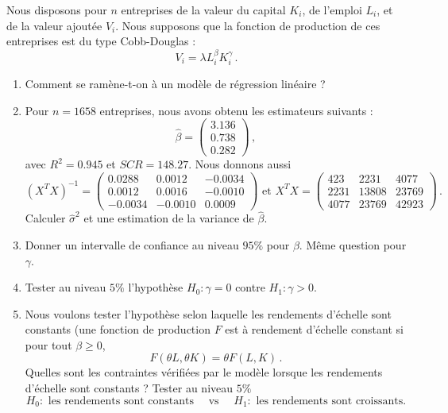 \documentclass{td_um}
\providecommand{\1}{\mathds{1}}
\begin{document}
	
	 Nous disposons pour $n$ entreprises de la valeur du capital $K_i$, de l'emploi $L_i$, et de la valeur ajoutée $V_i$. Nous supposons que la fonction de production de ces entreprises est du type Cobb-Douglas :
	\[
	V_i =\lambda L_i^\beta K_i^\gamma\,.
	\]
	\begin{enumerate}
		\item Comment se ramène-t-on à un modèle de régression linéaire ?
		\item Pour $n=1658$ entreprises, nous avons obtenu les estimateurs suivants :
		\[
		\hat \beta =
		\begin{pmatrix}
			3.136 \\
			0.738 \\
			0.282
		\end{pmatrix}\,,
		\]
		avec $R^2 = 0.945$ et $S C R = 148.27$. Nous donnons aussi
		\[
		(X^T X)^{-1} =
		\left(\begin{array}{ccc}
			0.0288 & 0.0012 & -0.0034 \\
			0.0012 & 0.0016 & -0.0010 \\
			-0.0034 & -0.0010 & 0.0009
		\end{array}\right)
		\text { et }
		X^T X =
		\left(\begin{array}{ccc}
			423 & 2231 & 4077 \\
			2231 & 13808 & 23769 \\
			4077 & 23769 & 42923
		\end{array}\right)\,.
		\]
		Calculer $\hat{\sigma}^{2}$ et une estimation de la variance de $\hat \beta$.
		\item Donner un intervalle de confiance au niveau $95 \%$ pour $\beta$. Même question pour $\gamma$.
		\item Tester au niveau $5 \%$ l'hypothèse $H_{0}: \gamma=0$ contre $H_{1}: \gamma>0$.
		\item Nous voulons tester l'hypothèse selon laquelle les rendements d'échelle sont constants (une fonction de production $F$ est à rendement d'échelle constant si pour tout $\beta \geq 0$,
		\[
		F(\theta L, \theta K)=\theta F(L, K)\,.
		\]
		Quelles sont les contraintes vérifiées par le modèle lorsque les rendements d'échelle sont constants ? Tester au niveau $5 \%$
		\[
		H_0 : \text{ les rendements sont constants} \quad \text{ vs } \quad H_1 : \text{ les rendements sont croissants.}
		\]
	\end{enumerate}
	
	
\end{document}
